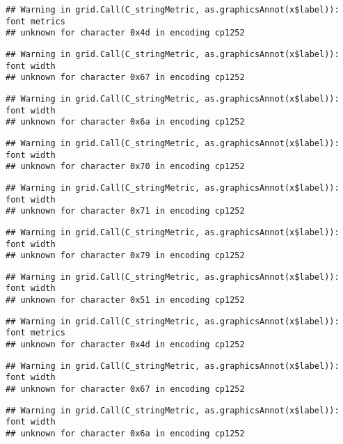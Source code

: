 \documentclass[
]{article}
\begin{document}
\begin{verbatim}
## Warning in grid.Call(C_stringMetric, as.graphicsAnnot(x$label)): font metrics
## unknown for character 0x4d in encoding cp1252
\end{verbatim}

\begin{verbatim}
## Warning in grid.Call(C_stringMetric, as.graphicsAnnot(x$label)): font width
## unknown for character 0x67 in encoding cp1252
\end{verbatim}

\begin{verbatim}
## Warning in grid.Call(C_stringMetric, as.graphicsAnnot(x$label)): font width
## unknown for character 0x6a in encoding cp1252
\end{verbatim}

\begin{verbatim}
## Warning in grid.Call(C_stringMetric, as.graphicsAnnot(x$label)): font width
## unknown for character 0x70 in encoding cp1252
\end{verbatim}

\begin{verbatim}
## Warning in grid.Call(C_stringMetric, as.graphicsAnnot(x$label)): font width
## unknown for character 0x71 in encoding cp1252
\end{verbatim}

\begin{verbatim}
## Warning in grid.Call(C_stringMetric, as.graphicsAnnot(x$label)): font width
## unknown for character 0x79 in encoding cp1252
\end{verbatim}

\begin{verbatim}
## Warning in grid.Call(C_stringMetric, as.graphicsAnnot(x$label)): font width
## unknown for character 0x51 in encoding cp1252
\end{verbatim}

\begin{verbatim}
## Warning in grid.Call(C_stringMetric, as.graphicsAnnot(x$label)): font metrics
## unknown for character 0x4d in encoding cp1252
\end{verbatim}

\begin{verbatim}
## Warning in grid.Call(C_stringMetric, as.graphicsAnnot(x$label)): font width
## unknown for character 0x67 in encoding cp1252
\end{verbatim}

\begin{verbatim}
## Warning in grid.Call(C_stringMetric, as.graphicsAnnot(x$label)): font width
## unknown for character 0x6a in encoding cp1252
\end{verbatim}
\end{document}
